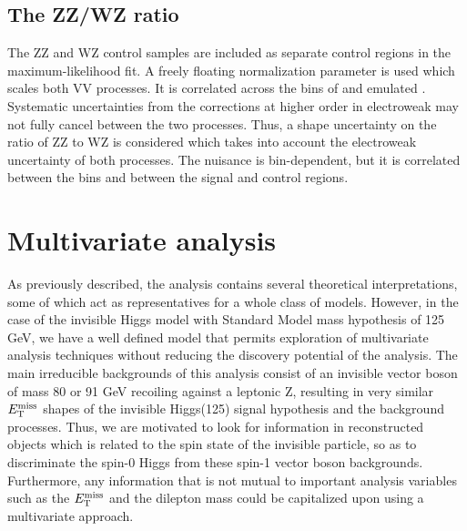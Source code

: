 \subsection{The ZZ/WZ ratio}

The ZZ and WZ control samples are included as separate control regions in the maximum-likelihood fit.
A freely floating normalization parameter is used which scales both VV processes. It is correlated across the bins of \met and emulated \met.
Systematic uncertainties from the corrections at higher order in electroweak may not fully cancel between the two processes.
Thus, a shape uncertainty on the ratio of ZZ to WZ is considered which takes into account the electroweak uncertainty of both processes.
The nuisance is bin-dependent, but it is correlated between the \met bins and between the signal and control regions.

\section{Multivariate analysis}
\label{sec:dmmva}
As previously described, the analysis contains several theoretical interpretations, some of which act as representatives for a whole class of models.
However, in the case of the invisible Higgs model with Standard Model mass hypothesis of 125 GeV, we have a well defined model
that permits exploration of multivariate analysis techniques without reducing the discovery potential of the analysis.
The main irreducible backgrounds of this analysis consist of an invisible vector boson of mass 80 or 91 GeV recoiling against a leptonic Z, resulting in very similar 
$E_\mathrm{T}^{\mathrm{miss}}$ shapes of the invisible Higgs(125) signal hypothesis and the background processes. Thus, we are motivated to look for information in reconstructed objects
which is related to the spin state of the invisible particle, so as to discriminate the spin-0 Higgs from these spin-1 vector boson backgrounds.
Furthermore, any information that is not mutual to important analysis variables such as the $E_\mathrm{T}^{\mathrm{miss}}$ and the dilepton mass could be capitalized upon using a multivariate approach.

